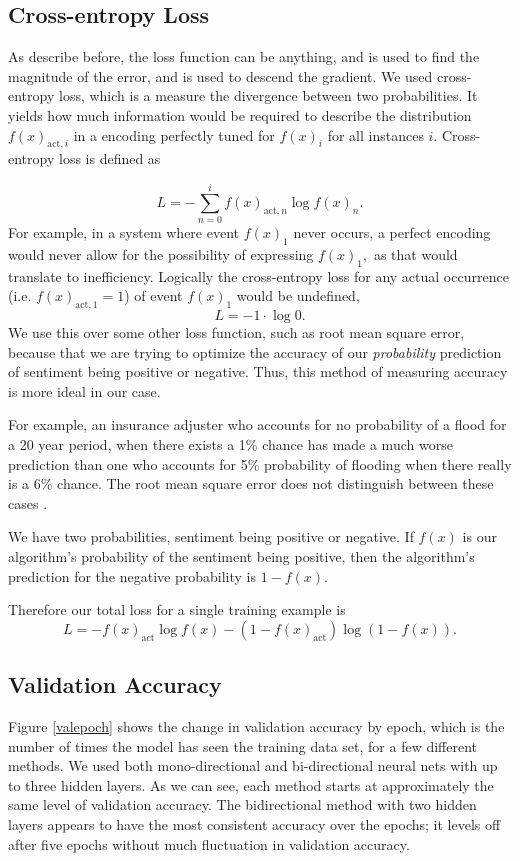 \documentclass[titlepage,letterpaper]{article}
\begin{document}
\subsection{Cross-entropy Loss} \label{loss-section}
As describe before, the loss function can be anything, and is used to find the magnitude of the error, and is used to descend the gradient. We used cross-entropy loss, which is a measure the divergence between two probabilities. It yields how much information would be required to describe the distribution \(f(x)_{\text{act},i} \) in a encoding perfectly tuned for \(f(x)_i \) for all instances \(i\). Cross-entropy loss is defined as \cite{NeuralNet}

\[L = -\sum_{n=0}^i f(x)_{\text{act},n} \log f(x)_n.\] 
For example, in a system where event \(f(x)_1\) never occurs, a perfect encoding would never allow for the possibility of expressing \(f(x)_1,\) as that would translate to inefficiency. Logically the cross-entropy loss for any actual occurrence (i.e. \(f(x)_{\text{act},1}= 1\)) of  event \(f(x)_1\) would be undefined,
\[L = -1\cdot\log 0.\]
We use this over some other loss function, such as root mean square error, because that we are trying to optimize the accuracy of our \textit{probability} prediction of sentiment being positive or negative. Thus, this method of measuring accuracy is more ideal in our case. 


For example, an insurance adjuster who accounts for no probability of a flood for a 20 year period, when there exists a 1\% chance has made a much worse prediction than one who accounts for 5\% probability of flooding when there really is a 6\% chance. The root mean square error does not distinguish between these cases \cite{NeuralNet}.

We have two probabilities, sentiment being positive or negative. If \(f(x)\) is our algorithm's probability of the sentiment being positive, then the algorithm's prediction for the negative probability is \(1-f(x)\).

Therefore our total loss for a single training example is
\[L = - f(x)_\text{act} \log f(x) -(1-f(x)_\text{act}) \log (1-f(x)).\]

\subsection{Validation Accuracy}
Figure \ref{valepoch} shows the change in validation accuracy by epoch, which is the number of times the model has seen the training data set, for a few different methods. We used both mono-directional and bi-directional neural nets with up to three hidden layers. As we can see, each method starts at approximately the same level of validation accuracy. The bidirectional method with two hidden layers appears to have the most consistent accuracy over the epochs; it levels off after five epochs without much fluctuation in validation accuracy. 
\end{document}
